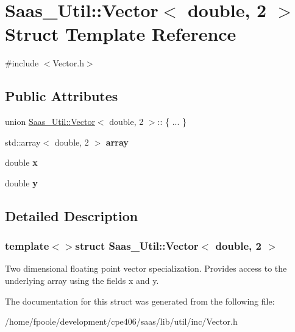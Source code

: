 \hypertarget{struct_saas___util_1_1_vector_3_01double_00_012_01_4}{}\section{Saas\+\_\+\+Util\+:\+:Vector$<$ double, 2 $>$ Struct Template Reference}
\label{struct_saas___util_1_1_vector_3_01double_00_012_01_4}


{\ttfamily \#include $<$Vector.\+h$>$}

\subsection*{Public Attributes}
\begin{DoxyCompactItemize}
\item 
\hypertarget{struct_saas___util_1_1_vector_3_01double_00_012_01_4_af720eb8abe120df05445f7724781f2d7}{}union \hyperlink{class_saas___util_1_1_vector}{Saas\+\_\+\+Util\+::\+Vector}$<$ double, 2 $>$\+:: \{ ... \}  \label{struct_saas___util_1_1_vector_3_01double_00_012_01_4_af720eb8abe120df05445f7724781f2d7}

\item 
\hypertarget{struct_saas___util_1_1_vector_3_01double_00_012_01_4_a9a611ebd5201ffe9156a2b17391a5fe4}{}std\+::array$<$ double, 2 $>$ {\bfseries array}\label{struct_saas___util_1_1_vector_3_01double_00_012_01_4_a9a611ebd5201ffe9156a2b17391a5fe4}

\item 
\hypertarget{struct_saas___util_1_1_vector_3_01double_00_012_01_4_a00f49af11f0a4be53e89ab65faa4a767}{}double {\bfseries x}\label{struct_saas___util_1_1_vector_3_01double_00_012_01_4_a00f49af11f0a4be53e89ab65faa4a767}

\item 
\hypertarget{struct_saas___util_1_1_vector_3_01double_00_012_01_4_a73699b3dc1007ecd27e59b4523e9a77a}{}double {\bfseries y}\label{struct_saas___util_1_1_vector_3_01double_00_012_01_4_a73699b3dc1007ecd27e59b4523e9a77a}

\end{DoxyCompactItemize}


\subsection{Detailed Description}
\subsubsection*{template$<$$>$struct Saas\+\_\+\+Util\+::\+Vector$<$ double, 2 $>$}

Two dimensional floating point vector specialization. Provides access to the underlying array using the fields x and y. 

The documentation for this struct was generated from the following file\+:\begin{DoxyCompactItemize}
\item 
/home/fpoole/development/cpe406/saas/lib/util/inc/Vector.\+h\end{DoxyCompactItemize}
